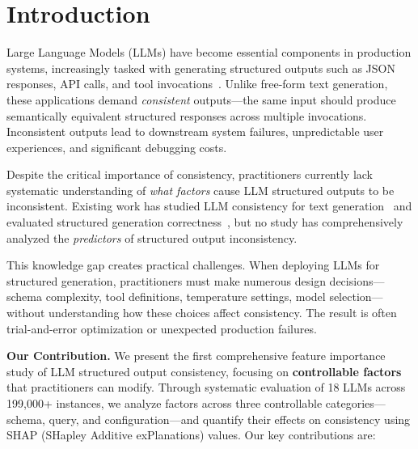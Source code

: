 \documentclass[sigconf,anonymous,review]{acmart}
\begin{document}

\maketitle

\section{Introduction}
\label{sec:intro}

Large Language Models (LLMs) have become essential components in production systems, increasingly tasked with generating structured outputs such as JSON responses, API calls, and tool invocations~\cite{patil2023gorilla,schick2024toolformer}. Unlike free-form text generation, these applications demand \textit{consistent} outputs---the same input should produce semantically equivalent structured responses across multiple invocations. Inconsistent outputs lead to downstream system failures, unpredictable user experiences, and significant debugging costs.

Despite the critical importance of consistency, practitioners currently lack systematic understanding of \textit{what factors} cause LLM structured outputs to be inconsistent. Existing work has studied LLM consistency for text generation~\cite{atil2024llmconsistency,renze2024effect} and evaluated structured generation correctness~\cite{geng2025jsonschema}, but no study has comprehensively analyzed the \textit{predictors} of structured output inconsistency.

This knowledge gap creates practical challenges. When deploying LLMs for structured generation, practitioners must make numerous design decisions---schema complexity, tool definitions, temperature settings, model selection---without understanding how these choices affect consistency. The result is often trial-and-error optimization or unexpected production failures.

\textbf{Our Contribution.} We present the first comprehensive feature importance study of LLM structured output consistency, focusing on \textbf{controllable factors} that practitioners can modify. Through systematic evaluation of 18 LLMs across 199,000+ instances, we analyze factors across three controllable categories---schema, query, and configuration---and quantify their effects on consistency using SHAP (SHapley Additive exPlanations) values. Our key contributions are:
\end{document}

